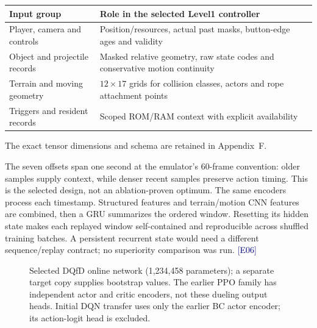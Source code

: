 \documentclass[11pt,a4paper]{article}
\newcommand{\ev}[1]{{\small\textcolor{navy}{[#1]}}}
\begin{document}
\begin{tabularx}{\linewidth}{@{}P{37mm}Y@{}}\toprule
Input group & Role in the selected Level1 controller\\\midrule
Player, camera and controls & Position/resources, actual past masks, button-edge ages and validity\\
Object and projectile records & Masked relative geometry, raw state codes and conservative motion continuity\\
Terrain and moving geometry & $12\times17$ grids for collision classes, actors and rope attachment points\\
Triggers and resident records & Scoped ROM/RAM context with explicit availability\\\bottomrule
\end{tabularx}
The exact tensor dimensions and schema are retained in Appendix~F.

The seven offsets span one second at the emulator's 60-frame convention: older samples supply context, while denser recent samples preserve action timing. This is the selected design, not an ablation-proven optimum. The same encoders process each timestamp. Structured features and terrain/motion CNN features are combined, then a GRU summarizes the ordered window. Resetting its hidden state makes each replayed window self-contained and reproducible across shuffled training batches. A persistent recurrent state would need a different sequence/replay contract; no superiority comparison was run. \ev{E06}

\begin{figure}[ht]\centering
{}
\caption{Selected DQfD online network (1,234,458 parameters); a separate target copy supplies bootstrap values. The earlier PPO family has independent actor and critic encoders, not these dueling output heads. Initial DQN transfer uses only the earlier BC actor encoder; its action-logit head is excluded.}\label{fig:model}
\end{figure}
\end{document}
